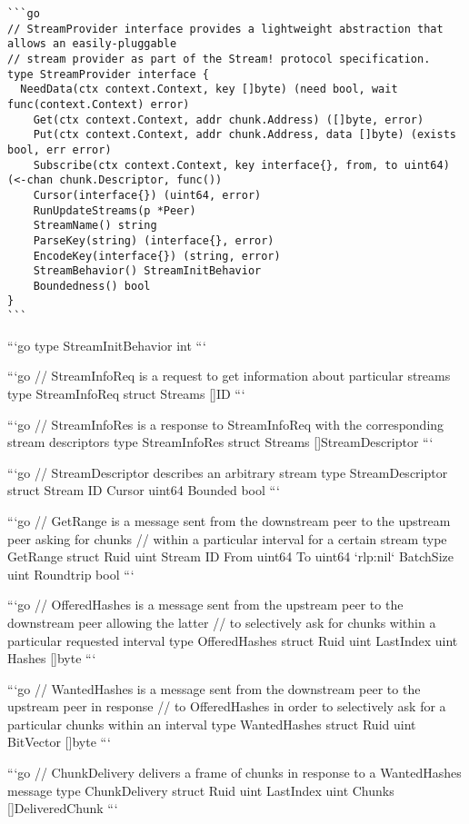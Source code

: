\lstset{basicstyle=\scriptsize, language=Golang}
\begin{lstlisting}
```go
// StreamProvider interface provides a lightweight abstraction that allows an easily-pluggable
// stream provider as part of the Stream! protocol specification.
type StreamProvider interface {
  NeedData(ctx context.Context, key []byte) (need bool, wait func(context.Context) error)
	Get(ctx context.Context, addr chunk.Address) ([]byte, error)
	Put(ctx context.Context, addr chunk.Address, data []byte) (exists bool, err error)
	Subscribe(ctx context.Context, key interface{}, from, to uint64) (<-chan chunk.Descriptor, func())
	Cursor(interface{}) (uint64, error)
	RunUpdateStreams(p *Peer)
	StreamName() string
	ParseKey(string) (interface{}, error)
	EncodeKey(interface{}) (string, error)
	StreamBehavior() StreamInitBehavior
	Boundedness() bool
}
```
\end{lstlisting}


```go
type StreamInitBehavior int
```

```go
// StreamInfoReq is a request to get information about particular streams
type StreamInfoReq struct {
	Streams []ID
}
```

```go
// StreamInfoRes is a response to StreamInfoReq with the corresponding stream descriptors
type StreamInfoRes struct {
	Streams []StreamDescriptor
}
```

```go
// StreamDescriptor describes an arbitrary stream
type StreamDescriptor struct {
	Stream  ID
	Cursor  uint64
	Bounded bool
}
```

```go
// GetRange is a message sent from the downstream peer to the upstream peer asking for chunks
// within a particular interval for a certain stream
type GetRange struct {
	Ruid      uint
	Stream    ID
	From      uint64
	To        uint64 `rlp:nil`
	BatchSize uint
	Roundtrip bool
}
```

```go
// OfferedHashes is a message sent from the upstream peer to the downstream peer allowing the latter
// to selectively ask for chunks within a particular requested interval
type OfferedHashes struct {
	Ruid      uint
	LastIndex uint
	Hashes    []byte
}
```

```go
// WantedHashes is a message sent from the downstream peer to the upstream peer in response
// to OfferedHashes in order to selectively ask for a particular chunks within an interval
type WantedHashes struct {
	Ruid      uint
	BitVector []byte
}
```

```go
// ChunkDelivery delivers a frame of chunks in response to a WantedHashes message
type ChunkDelivery struct {
	Ruid      uint
	LastIndex uint
	Chunks    []DeliveredChunk
}
```

